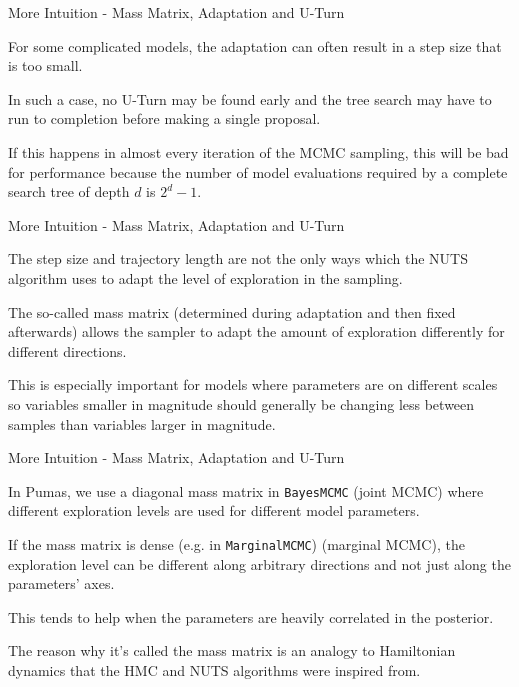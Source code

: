 \begin{frame}{More Intuition - Mass Matrix, Adaptation and U-Turn}
	\begin{vfilleditems}
		\item For some complicated models, the adaptation can often result in a step size that is too small.
		\item In such a case, no U-Turn may be found early and the tree search may have to run to completion before making a single proposal.
		\item If this happens in almost every iteration of the MCMC sampling, this will be bad for performance because the number of model evaluations required by a complete search tree of depth $d$ is $2^d - 1$.
	\end{vfilleditems}
\end{frame}

\begin{frame}{More Intuition - Mass Matrix, Adaptation and U-Turn}
	\begin{vfilleditems}
		\item The step size and trajectory length are not the only ways which the NUTS algorithm uses to adapt the level of exploration in the sampling.
		\item The so-called mass matrix (determined during adaptation and then fixed afterwards) allows the sampler to adapt the amount of exploration differently for different directions.
		\item This is especially important for models where parameters are on different scales so variables smaller in magnitude should generally be changing less between samples than variables larger in magnitude.
	\end{vfilleditems}
\end{frame}

\begin{frame}{More Intuition - Mass Matrix, Adaptation and U-Turn}
	\begin{vfilleditems}
		\item In Pumas, we use a diagonal mass matrix in \lstinline{BayesMCMC} (joint MCMC) where different exploration levels are used for different model parameters.
		\item If the mass matrix is dense (e.g. in \lstinline{MarginalMCMC}) (marginal MCMC), the exploration level can be different along arbitrary directions and not just along the parameters' axes.
		\item This tends to help when the parameters are heavily correlated in the posterior.
		\item The reason why it's called the mass matrix is an analogy to Hamiltonian dynamics that the HMC and NUTS algorithms were inspired from.
	\end{vfilleditems}
\end{frame}

